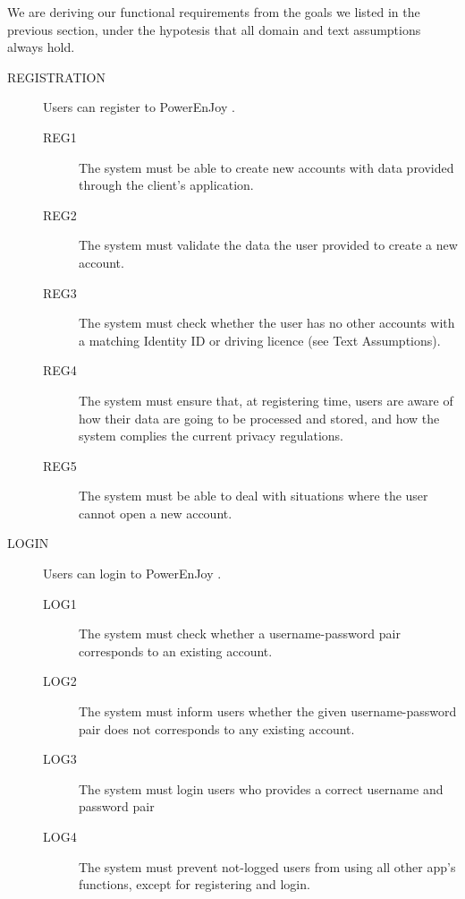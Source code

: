 \documentclass[11pt]{article} %
\newcommand{\pe}{PowerEnJoy }
\begin{document}
We are deriving our functional requirements from the goals we listed in the previous section, under the hypotesis that all domain and text assumptions always hold.

\begin{description}
	\item[REGISTRATION] Users can register to \pe.
	\begin{description}
	\item[REG1] The system must be able to create new accounts with data provided through the client's application.
	\item[REG2] The system must validate the data the user provided to create a new account.
	\item[REG3] The system must check whether the user has no other accounts with a matching Identity ID or driving licence (see Text Assumptions).
	\item[REG4] The system must ensure that, at registering time, users are aware of how their data are going to be processed and stored, and how the system complies the current privacy regulations.
	\item[REG5] The system must be able to deal with situations where the user cannot open a new account.
	\end{description}

	\item[LOGIN] Users can login to \pe.
	\begin{description}
	\item[LOG1] The system must check whether a username-password pair corresponds to an existing account.
	\item[LOG2] The system must inform users whether the given username-password pair does not corresponds to any existing account.
	\item[LOG3] The system must login users who provides a correct username and password pair
	\item[LOG4] The system must prevent not-logged users from using all other app's functions, except for registering and login.
	\end{description}


\end{description}
\end{document}
